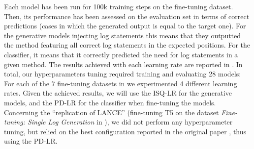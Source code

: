 Each model has been run for 100k training steps on the fine-tuning dataset. Then, its performance has been assessed on the evaluation set in terms of correct predictions (\ie cases in which the generated output is equal to the target one). For the generative models injecting log statements this means that they outputted the \java method featuring all correct log statements in the expected positions. For the classifier, it means that it correctly predicted the need for log statements in a given \java method. The results achieved with each learning rate are reported in . In total, our hyperparameters tuning required training and evaluating 28 models: For each of the 7 fine-tuning datasets in  we experimented 4 different learning rates. Given the achieved results, we will use the ISQ-LR for the generative models, and the PD-LR for the classifier when fine-tuning the models. Concerning the ``replication of LANCE'' (\ie fine-tuning T5 on the dataset \emph{Fine-tuning: Single Log Generation} in ), we did not perform any hyperparameter tuning, but relied on the best configuration reported in the original paper \cite{mastropaolo2021studying}, thus using the PD-LR.

